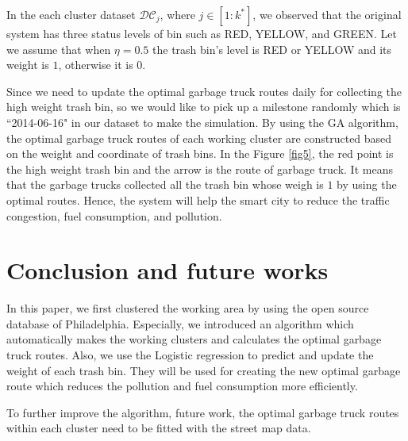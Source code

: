 \documentclass[conference]{IEEEtran}
\begin{document}
In the each cluster dataset $\mathcal{DC}_j$, where $j \in [1:k^*]$, we observed that the original system has three status levels of bin such as RED, YELLOW, and GREEN. Let we assume that when $\eta = 0.5$ the trash bin's level is RED or YELLOW and its weight is $1$, otherwise it is $0$.

\par Since we need to update the optimal garbage truck routes daily for collecting the high weight trash bin, so we would like to pick up a milestone randomly which is ``2014-06-16" in our dataset to make the simulation. By using the GA algorithm, the optimal garbage truck routes of each working cluster are constructed based on the weight and coordinate of trash bins. In the Figure \ref{fig5}, the red point is the high weight trash bin and the arrow is the route of garbage truck. It means that the garbage trucks collected all the trash bin whose weigh is $1$ by using the optimal routes. Hence, the system will help the smart city to reduce the traffic congestion, fuel consumption, and pollution.






\section{Conclusion and future works}
\label{section4}

In this paper, we first clustered the working area by using the open source database of Philadelphia. Especially, we introduced an algorithm which automatically makes the working clusters and calculates the optimal garbage truck routes. Also, we use the Logistic regression to predict and update the weight of each trash bin. They will be used for creating the new optimal garbage route which reduces the pollution and fuel consumption more efficiently.  

To further improve the algorithm, future work, the optimal garbage truck routes within each cluster need to be fitted with the street map data.


%
%
\end{document}

